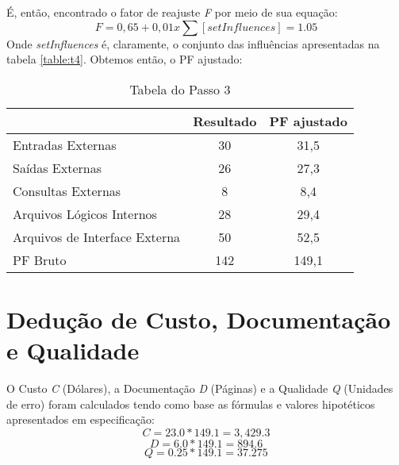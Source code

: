 \documentclass[
10pt, %
a4paper, %
oneside, %
headinclude,footinclude, %
BCOR5mm, %
]{scrartcl}
\begin{document}
É, então, encontrado o fator de reajuste \textit{F} por meio de sua equação:
\begin{equation}
	F = 0,65 + 0,01 x \sum[setInfluences] = 1.05
\end{equation}
Onde \textit{setInfluences} é, claramente, o conjunto das influências
apresentadas na tabela \ref{table:t4}. Obtemos então, o PF ajustado:
\begin{table}[!h]
	\centering
	\begin{tabular}{l | c c}
		\hline\hline
		\multicolumn{1}{c}{ } & Resultado & PF ajustado\\ 
		\hline\hline
		\multirow{3}{*}{Entradas Externas} & \multirow{3}{*}{30} & \multirow{3}{*}{31,5}\\ 
		&  & \\ 
		&  & \\ 
		\hline
		\multirow{3}{*}{Saídas Externas} & \multirow{3}{*}{26} & \multirow{3}{*}{27,3}\\ 
		&  & \\ 
		&  & \\ 
		\hline
		\multirow{3}{*}{Consultas Externas} & \multirow{3}{*}{8} & \multirow{3}{*}{8,4}\\ 
		&  & \\ 
		&  & \\ 
		\hline
		\multirow{3}{*}{Arquivos Lógicos Internos} & \multirow{3}{*}{28} & \multirow{3}{*}{29,4}\\ 
		&  & \\ 
		&  & \\ 
		\hline
		\multirow{3}{*}{Arquivos de Interface Externa} & \multirow{3}{*}{50} & \multirow{3}{*}{52,5}\\ 
		&  & \\ 
		&  & \\ 
		\hline
		\multicolumn{1}{l}{PF Bruto} & 142 & 149,1\\ 
		\hline
	\hline\end{tabular}
	\caption{\small{Tabela do Passo 3}} 
	\label{table:t5}
\end{table}

\newpage %


\section{Dedução de Custo, Documentação e Qualidade}\label{cdq}
O Custo \textit{C} (Dólares), a Documentação \textit{D} (Páginas) e a
Qualidade \textit{Q} (Unidades de erro) foram calculados tendo como base as
fórmulas e valores hipotéticos apresentados em especificação:
\begin{equation}
	C = 23.0 * 149.1 = 3,429.3
\end{equation}
\begin{equation}
	D = 6.0 * 149.1 = 894.6
\end{equation}
\begin{equation}
	Q = 0.25 * 149.1 = 37.275
\end{equation}
\end{document}
